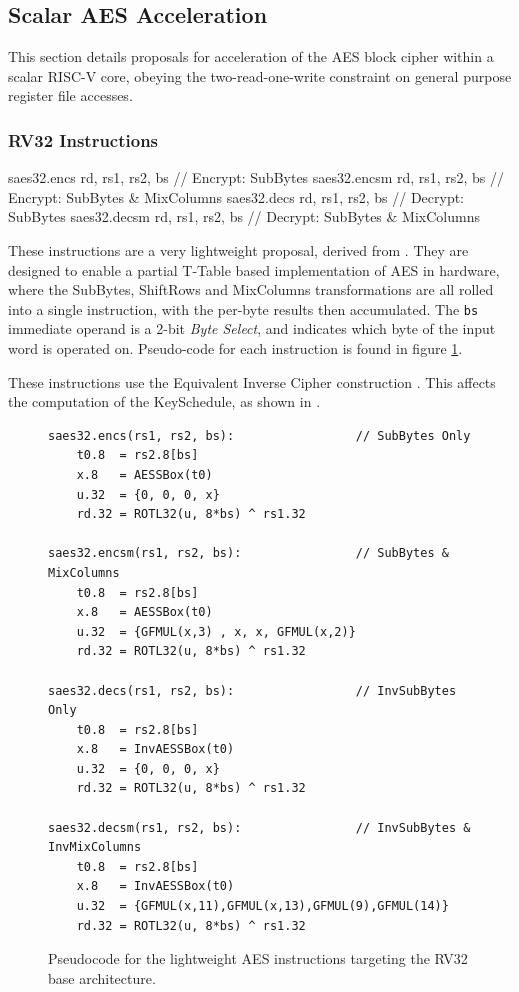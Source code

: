 
\newpage
\subsection{Scalar AES Acceleration}
\label{sec:scalar:aes}

This section details proposals for acceleration of
the AES block cipher \cite{nist:fips:197} within a scalar RISC-V core,
obeying the two-read-one-write constraint on general purpose register
file accesses.

\subsubsection{RV32 Instructions}
\label{sec:scalar:aes:rv32}

\begin{cryptoisa}
saes32.encs      rd, rs1, rs2, bs // Encrypt: SubBytes
saes32.encsm     rd, rs1, rs2, bs // Encrypt: SubBytes & MixColumns
saes32.decs      rd, rs1, rs2, bs // Decrypt: SubBytes
saes32.decsm     rd, rs1, rs2, bs // Decrypt: SubBytes & MixColumns
\end{cryptoisa}

These instructions are a very lightweight proposal, derived from
\cite{MJS:LWAES:20}.
They are designed to enable a partial T-Table based implementation
of AES in hardware, where the SubBytes, ShiftRows and MixColumns
transformations are all rolled into a single instruction, with the
per-byte results then accumulated.
The {\tt bs} immediate operand is a 2-bit {\em Byte Select}, and indicates
which byte of the input word is operated on.
Pseudo-code for each instruction is found in figure
\ref{fig:pseudo:aes:rv32}.

These instructions use the Equivalent Inverse Cipher
construction \cite[Section 5.3.5]{nist:fips:197}.
This affects the computation of the KeySchedule, as shown in
\cite[Figure 15]{nist:fips:197}.

\begin{figure}[h]
\begin{lstlisting}[language=pseudo]
saes32.encs(rs1, rs2, bs):                 // SubBytes Only
    t0.8  = rs2.8[bs]
    x.8   = AESSBox(t0)
    u.32  = {0, 0, 0, x}
    rd.32 = ROTL32(u, 8*bs) ^ rs1.32

saes32.encsm(rs1, rs2, bs):                // SubBytes & MixColumns
    t0.8  = rs2.8[bs]
    x.8   = AESSBox(t0)
    u.32  = {GFMUL(x,3) , x, x, GFMUL(x,2)}
    rd.32 = ROTL32(u, 8*bs) ^ rs1.32

saes32.decs(rs1, rs2, bs):                 // InvSubBytes Only
    t0.8  = rs2.8[bs]
    x.8   = InvAESSBox(t0)
    u.32  = {0, 0, 0, x}
    rd.32 = ROTL32(u, 8*bs) ^ rs1.32

saes32.decsm(rs1, rs2, bs):                // InvSubBytes & InvMixColumns
    t0.8  = rs2.8[bs]
    x.8   = InvAESSBox(t0)
    u.32  = {GFMUL(x,11),GFMUL(x,13),GFMUL(9),GFMUL(14)}
    rd.32 = ROTL32(u, 8*bs) ^ rs1.32
\end{lstlisting}
\caption{Pseudocode for the lightweight AES instructions targeting the
RV32 base architecture.}
\label{fig:pseudo:aes:rv32}
\end{figure}

